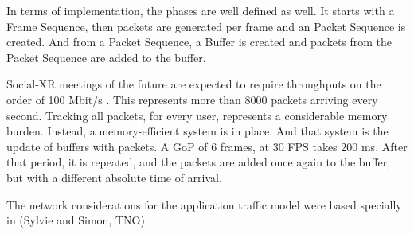 In terms of implementation, the phases are well defined as well. It starts with a Frame Sequence, then packets are generated per frame and an Packet Sequence is created. And from a Packet Sequence, a Buffer is created and packets from the Packet Sequence are added to the buffer. 

Social-XR meetings of the future are expected to require throughputs on the order of 100 Mbit/s \cite{3gpp.26.928}. This represents more than 8000 packets arriving every second. Tracking all packets, for every user, represents a considerable memory burden. Instead, a memory-efficient system is in place. And that system is the update of buffers with packets. A \acs{GoP} of 6 frames, at 30 \acs{FPS} takes 200 ms. After that period, it is repeated, and the packets are added once again to the buffer, but with a different absolute time of arrival.


The network considerations for the application traffic model were based specially in \cite{multi-sensor-sylvie, vr-simon} (Sylvie and Simon, TNO).

